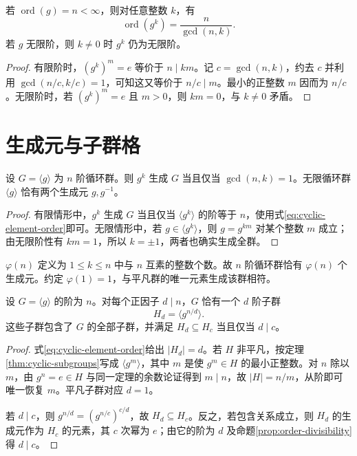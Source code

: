 \documentclass[UTF8,12pt,a4paper,fontset=fandol]{ctexbook}
\begin{document}
\begin{proposition}[循环群中的元素阶]\label{prop:cyclic-element-order}
若 $\operatorname{ord}(g)=n<\infty$，则对任意整数 $k$，有
\begin{equation}\label{eq:cyclic-element-order}
  \operatorname{ord}(g^k)=\frac{n}{\gcd(n,k)}.
\end{equation}
若 $g$ 无限阶，则 $k\ne0$ 时 $g^k$ 仍为无限阶。
\end{proposition}
\begin{proof}
有限阶时，$(g^k)^m=e$ 等价于 $n\mid km$。记 $c=\gcd(n,k)$，约去 $c$ 并利用 $\gcd(n/c,k/c)=1$，可知这又等价于 $n/c\mid m$。最小的正整数 $m$ 因而为 $n/c$。无限阶时，若 $(g^k)^m=e$ 且 $m>0$，则 $km=0$，与 $k\ne0$ 矛盾。
\end{proof}

\section{生成元与子群格}\label{sec:cyclic-subgroup-lattice}

\begin{corollary}[生成元判别]\label{cor:cyclic-generators}
设 $G=\langle g\rangle$ 为 $n$ 阶循环群。则 $g^k$ 生成 $G$ 当且仅当 $\gcd(n,k)=1$。无限循环群 $\langle g\rangle$ 恰有两个生成元 $g,g^{-1}$。
\end{corollary}
\begin{proof}
有限情形中，$g^k$ 生成 $G$ 当且仅当 $\langle g^k\rangle$ 的阶等于 $n$，使用式\eqref{eq:cyclic-element-order}即可。无限情形中，若 $g\in\langle g^k\rangle$，则 $g=g^{km}$ 对某个整数 $m$ 成立；由无限阶性有 $km=1$，所以 $k=\pm1$，两者也确实生成全群。
\end{proof}

$\varphi(n)$ 定义为 $1\leq k\leq n$ 中与 $n$ 互素的整数个数。故 $n$ 阶循环群恰有 $\varphi(n)$ 个生成元。约定 $\varphi(1)=1$，与平凡群的唯一元素生成该群相符。

\begin{theorem}[有限循环群的子群分类]\label{thm:finite-cyclic-subgroups}
设 $G=\langle g\rangle$ 的阶为 $n$。对每个正因子 $d\mid n$，$G$ 恰有一个 $d$ 阶子群
\begin{equation}\label{eq:cyclic-subgroup-divisor}
  H_d=\langle g^{n/d}\rangle.
\end{equation}
这些子群包含了 $G$ 的全部子群，并满足 $H_d\subseteq H_c$ 当且仅当 $d\mid c$。
\end{theorem}
\begin{proof}
式\eqref{eq:cyclic-element-order}给出 $|H_d|=d$。若 $H$ 非平凡，按定理\ref{thm:cyclic-subgroups}写成 $\langle g^m\rangle$，其中 $m$ 是使 $g^m\in H$ 的最小正整数。对 $n$ 除以 $m$，由 $g^n=e\in H$ 与同一定理的余数论证得到 $m\mid n$，故 $|H|=n/m$，从阶即可唯一恢复 $m$。平凡子群对应 $d=1$。

若 $d\mid c$，则 $g^{n/d}=(g^{n/c})^{c/d}$，故 $H_d\subseteq H_c$。反之，若包含关系成立，则 $H_d$ 的生成元作为 $H_c$ 的元素，其 $c$ 次幂为 $e$；由它的阶为 $d$ 及命题\ref{prop:order-divisibility}得 $d\mid c$。
\end{proof}
\end{document}
